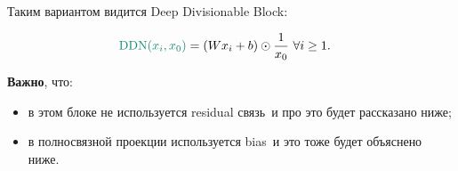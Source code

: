 \documentclass{report}
\begin{document}
\par Таким вариантом видится \color{PineGreen}Deep Divisionable Block\color{black}:
\begin{tcolorbox}[title=DDN блок, colframe=PineGreen!90]
    \begin{align}
        \label{ddn:intro:ddn}
        \color{PineGreen}\mathrm{DDN}(x_i, x_0)\color{black} &= (Wx_i+b)\odot \frac{1}{x_0} \ \forall i\ge 1.
    \end{align}
\end{tcolorbox}

\par \textbf{Важно}, что:
\begin{itemize}
    \item в этом блоке \color{red}не используется residual связь\color{black}\ и про это будет рассказано ниже;
    \item в полносвязной проекции \color{magenta}используется bias\color{black}\ и это тоже будет объяснено ниже.
\end{itemize}
\end{document}
